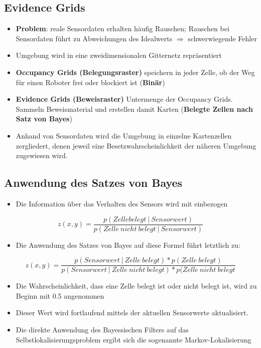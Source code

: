 \subsection{Evidence Grids}
\begin{itemize}
	\item \textbf{Problem}: reale Sensordaten erhalten häufig Rauschen; Rauschen bei Sensordaten führt zu Abweichungen des Idealwerts $\Rightarrow$ schwerwiegende Fehler
	\item Umgebung wird in eine zweidimensionalen Gitternetz repräsentiert
	\item \textbf{Occupancy Grids (Belegungsraster)} speichern in jeder Zelle, ob der Weg für einen Roboter frei oder blockiert ist (\textbf{Binär})
	\item \textbf{Evidence Grids (Beweisraster)} Untermenge der Occupancy Grids. Sammeln Beweismaterial und erstellen damit Karten (\textbf{Belegte Zellen nach Satz von Bayes})
	\item Anhand von Sensordaten wird die Umgebung in einzelne Kartenzellen zergliedert, denen jeweil eine Besetzwahrscheinlichkeit der näheren Umgebung zugewiesen wird.
\end{itemize}
\subsection{Anwendung des Satzes von Bayes}
\begin{itemize}
	\item Die Information über das Verhalten des Sensors wird mit einbezogen
\end{itemize}
\[
	z(x,y)= \frac{p(Zelle belegt \ | \ Sensorwert)}{p(Zelle \ nicht \ belegt \ | \ Sensorwert)}
\]
\begin{itemize}
	\item Die Anwendung des Satzes von Bayes auf diese Formel führt letztlich zu:
\end{itemize}
\[
	z(x,y) = \frac{p(Sensorwert \ | \ Zelle  \ belegt) * p(Zelle \ belegt)}{p(Sensorwert \ | \ Zelle \ nicht \ belegt) * p(Zelle \ nicht \ belegt}
\]
\begin{itemize}
	\item Die Wahrscheinlichkeit, dass eine Zelle belegt ist oder nicht belegt ist, wird zu Beginn mit 0.5 angenommen
	\item Dieser Wert wird fortlaufend mittels der aktuellen Sensorwerte aktualisiert.
	\item Die direkte Anwendung des Bayessischen Filters auf das Selbstlokalisierungsproblem ergibt sich die sogenannte Markov-Lokalisierung
\end{itemize}

